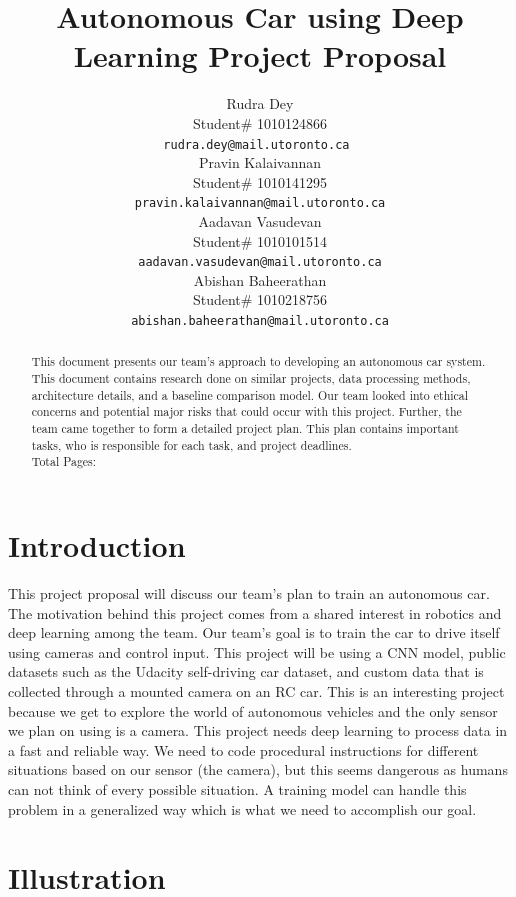 \documentclass{article} %
\title{Autonomous Car using Deep Learning Project Proposal\\}
\author{Rudra Dey  \\
Student\# 1010124866\\
\texttt{rudra.dey@mail.utoronto.ca } \\
\And
Pravin Kalaivannan  \\
Student\# 1010141295 \\
\texttt{pravin.kalaivannan@mail.utoronto.ca} \\
\AND
Aadavan Vasudevan  \\
Student\# 1010101514 \\
\texttt{aadavan.vasudevan@mail.utoronto.ca} \\
\And
Abishan Baheerathan \\
Student\# 1010218756 \\
\texttt{abishan.baheerathan@mail.utoronto.ca} \\
\AND
}
\begin{document}
\maketitle

\begin{abstract}
This document presents our team's approach to developing an autonomous car system. This document contains research done on similar projects, data processing methods, 
architecture details, and a baseline comparison model. Our team looked into ethical 
concerns and potential major risks that could occur with this project. Further, the team came 
together to form a detailed project plan. This plan contains important tasks, 
who is responsible for each task, and project deadlines.\\
Total Pages: \pageref{last_page}
\end{abstract}



\section{Introduction}


This project proposal will discuss our team’s plan to train an 
autonomous car. The motivation behind this project comes from a shared interest in robotics and deep 
learning among the team. Our team’s goal is to train the car to drive itself using cameras and control 
input. This project will be using a CNN model, public datasets such as the Udacity self-driving car dataset, 
and custom data that is collected through a mounted camera on an RC car. This is an interesting project 
because we get to explore the world of autonomous vehicles and the only sensor we plan on using is a camera. 
This project needs deep learning to process data in a fast and reliable way. We need to code procedural 
instructions for different situations based on our sensor (the camera), but this seems dangerous as humans 
can not think of every possible situation. A training model can handle this problem in a generalized way 
which is what we need to accomplish our goal. 
 
\section{Illustration}
\label{headings}
\end{document}
